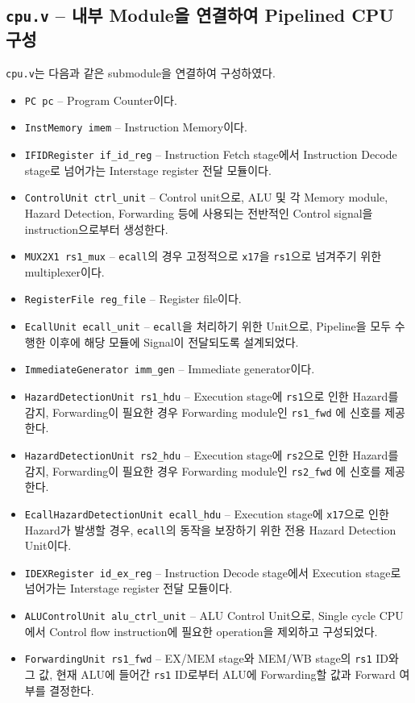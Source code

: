 \documentclass{scrartcl}
\begin{document}
\subsection{\texttt{cpu.v} -- 내부 Module을 연결하여 Pipelined CPU 구성}
\texttt{cpu.v}는 다음과 같은 submodule을 연결하여 구성하였다.
\begin{itemize}
  \item \texttt{PC pc} -- Program Counter이다.
  \item \texttt{InstMemory imem} -- Instruction Memory이다.
  \item \texttt{IFIDRegister if\_id\_reg} -- Instruction Fetch stage에서 Instruction Decode stage로 넘어가는 Interstage register 전달 모듈이다.
  \item \texttt{ControlUnit ctrl\_unit} -- Control unit으로, ALU 및 각 Memory module, Hazard Detection, Forwarding 등에 사용되는 전반적인 Control signal을 instruction으로부터 생성한다.
  \item \texttt{MUX2X1 rs1\_mux} -- \texttt{ecall}의 경우 고정적으로 \texttt{x17}을 \texttt{rs1}으로 넘겨주기 위한 multiplexer이다.
  \item \texttt{RegisterFile reg\_file} -- Register file이다.
  \item \texttt{EcallUnit ecall\_unit} -- \texttt{ecall}을 처리하기 위한 Unit으로, Pipeline을 모두 수행한 이후에 해당 모듈에 Signal이 전달되도록 설계되었다.
  \item \texttt{ImmediateGenerator imm\_gen} -- Immediate generator이다.
  \item \texttt{HazardDetectionUnit rs1\_hdu} -- Execution stage에 \texttt{rs1}으로 인한 Hazard를 감지, Forwarding이 필요한 경우 Forwarding module인 \texttt{rs1\_fwd} 에 신호를 제공한다.
  \item \texttt{HazardDetectionUnit rs2\_hdu} -- Execution stage에 \texttt{rs2}으로 인한 Hazard를 감지, Forwarding이 필요한 경우 Forwarding module인 \texttt{rs2\_fwd} 에 신호를 제공한다.
  \item \texttt{EcallHazardDetectionUnit ecall\_hdu} -- Execution stage에 \texttt{x17}으로 인한 Hazard가 발생할 경우, \texttt{ecall}의 동작을 보장하기 위한 전용 Hazard Detection Unit이다.
  \item \texttt{IDEXRegister id\_ex\_reg} -- Instruction Decode stage에서 Execution stage로 넘어가는 Interstage register 전달 모듈이다.
  \item \texttt{ALUControlUnit alu\_ctrl\_unit} -- ALU Control Unit으로, Single cycle CPU에서 Control flow instruction에 필요한 operation을 제외하고 구성되었다.
  \item \texttt{ForwardingUnit rs1\_fwd} -- EX/MEM stage와 MEM/WB stage의 \texttt{rs1} ID와 그 값, 현재 ALU에 들어간 \texttt{rs1} ID로부터 ALU에 Forwarding할 값과 Forward 여부를 결정한다.

\end{itemize}
\end{document}
